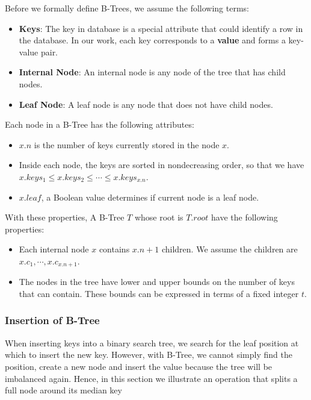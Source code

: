 Before we formally define B-Trees, we assume the following terms:

\begin{itemize}
\item
  \textbf{Keys}: The key in database is a special attribute that could
  identify a row in the database. In our work, each key corresponds to a
  \textbf{value} and forms a key-value pair.
\item
  \textbf{Internal Node}: An internal node is any node of the tree that
  has child nodes.
\item
  \textbf{Leaf Node}: A leaf node is any node that does not have child
  nodes.
\end{itemize}

Each node in a B-Tree has the following attributes:

\begin{itemize}
\item
  $x.n$ is the number of keys currently stored in the node $x$.
\item
  Inside each node, the keys are sorted in nondecreasing order, so that
  we have $x.keys_1\leq x.keys_2\leq\cdots\leq x.keys_{x.n}$.
\item
  $x.leaf$, a Boolean value determines if current node is a leaf node.
\end{itemize}

With these properties, A B-Tree $T$ whose root is $T.root$ have the
following properties:

\begin{itemize}
\item
  Each internal node $x$ contains $x.n+1$ children. We assume the
  children are $x.c_1,\cdots,x.c_{x.n+1}$.
\item
  The nodes in the tree have lower and upper bounds on the number of
  keys that can contain. These bounds can be expressed in terms of a
  fixed integer $t$.
\end{itemize}

\subsubsection{Insertion of B-Tree}

When inserting keys into a binary search tree, we search for the leaf
position at which to insert the new key. However, with B-Tree, we cannot
simply find the position, create a new node and insert the value because
the tree will be imbalanced again. Hence, in this section we illustrate
an operation that splits a full node around its median key

